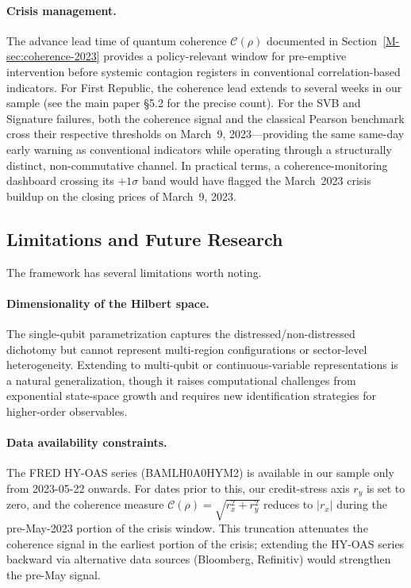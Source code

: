 \paragraph{Crisis management.}
The advance lead time of quantum coherence $\mathcal{C}(\rho)$ documented in
Section~\ref{M-sec:coherence-2023} provides a policy-relevant window for
pre-emptive intervention before systemic contagion registers in conventional
correlation-based indicators. For First Republic, the coherence lead
extends to several weeks in our sample (see the main paper §5.2 for the
precise count). For the SVB and Signature failures, both the coherence signal
and the classical Pearson benchmark cross their respective thresholds on March~9,
2023---providing the same same-day early warning as conventional indicators while
operating through a structurally distinct, non-commutative channel. In practical
terms, a coherence-monitoring dashboard crossing its $+1\sigma$ band would have
flagged the March~2023 crisis buildup on the closing prices of March~9, 2023.

\subsection{Limitations and Future Research}\label{sec:limitations}

The framework has several limitations worth noting.

\paragraph{Dimensionality of the Hilbert space.}
The single-qubit parametrization captures the distressed/non-distressed dichotomy
but cannot represent multi-region configurations or sector-level heterogeneity.
Extending to multi-qubit or continuous-variable representations is a natural
generalization, though it raises computational challenges from exponential
state-space growth and requires new identification strategies for higher-order
observables.

\paragraph{Data availability constraints.}
The FRED HY-OAS series (BAMLH0A0HYM2) is available in our sample only from
2023-05-22 onwards. For dates prior to this, our credit-stress axis $r_y$ is
set to zero, and the coherence measure $\mathcal{C}(\rho) = \sqrt{r_x^2 + r_y^2}$
reduces to $|r_x|$ during the pre-May-2023 portion of the crisis window. This
truncation attenuates the coherence signal in the earliest portion of the crisis;
extending the HY-OAS series backward via alternative data sources (Bloomberg,
Refinitiv) would strengthen the pre-May signal.

